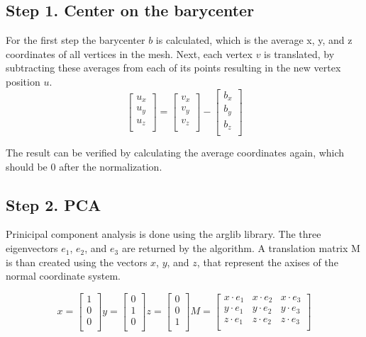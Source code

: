 \documentclass{bigdata}
\begin{document}
\subsection{Step 1. Center on the barycenter}

For the first step the barycenter $b$ is calculated, which is the average x, y, and z coordinates of all vertices in the mesh. Next, each vertex $v$ is translated, by subtracting these averages from each of its points resulting in the new vertex position $u$.
\[
\begin{bmatrix}
u_x \\
u_y \\
u_z \\
\end{bmatrix}
=
\begin{bmatrix}
v_x \\
v_y \\
v_z \\
\end{bmatrix}
-
\begin{bmatrix}
b_x \\
b_y \\
b_z \\
\end{bmatrix}
\]

The result can be verified by calculating the average coordinates again, which should be 0 after the normalization.

\subsection{Step 2. PCA}
Prinicipal component analysis is done using the arglib library. The three eigenvectors $e_1$, $e_2$, and $e_3$ are returned by the algorithm. A translation matrix M is than created using the vectors $x$, $y$, and $z$, that represent the axises of the normal coordinate system.

\[
x = 
\begin{bmatrix}
1 \\
0 \\
0 \\
\end{bmatrix}
y =
\begin{bmatrix}
0 \\
1 \\
0 \\
\end{bmatrix}
z =
\begin{bmatrix}
0 \\
0 \\
1 \\
\end{bmatrix}
M =
\begin{bmatrix}
x \cdot e_1 & x \cdot e_2 & x \cdot e_3 \\
y \cdot e_1 & y \cdot e_2 & y \cdot e_3 \\
z \cdot e_1 & z \cdot e_2 & z \cdot e_3 \\
\end{bmatrix}
\]
\end{document}
